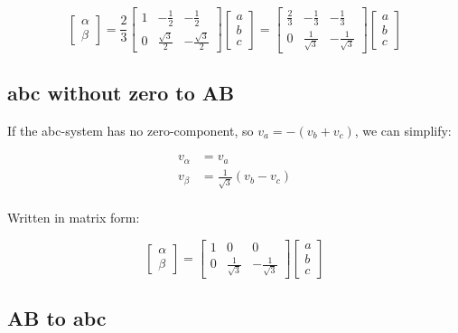 \documentclass[]{book}
\begin{document}
\[
\begin{bmatrix} \alpha\\ \beta \end{bmatrix}
= \frac{2}{3} \begin{bmatrix} 1 & -\frac{1}{2} & -\frac{1}{2} \\ 0 & \frac{\sqrt{3}}{2} & -\frac{\sqrt{3}}{2} \end{bmatrix}  
\begin{bmatrix} a\\ b \\ c \end{bmatrix}
= \begin{bmatrix} \frac{2}{3} & -\frac{1}{3} & -\frac{1}{3} \\ 0 & \frac{1}{\sqrt{3}} & -\frac{1}{\sqrt{3}} \end{bmatrix}
\begin{bmatrix} a\\ b \\ c \end{bmatrix}
\label{eq:abcAB2}
\]

\hypertarget{abc-without-zero-to-ab}{%
\subsection{abc without zero to AB}\label{abc-without-zero-to-ab}}

If the abc-system has no zero-component, so \(v_a=-(v_b+v_c)\), we can simplify:

\[
\begin{aligned}
v_\alpha &=   v_a\\
v_\beta &=  \frac{1}{\sqrt{3}} (v_b-v_c) \\
\end{aligned}
\label{eq:abcAB2}
\]

Written in matrix form:

\[
\begin{bmatrix} \alpha\\ \beta \end{bmatrix}
= \begin{bmatrix} 1 & 0 & 0 \\ 0 & \frac{1}{\sqrt{3}} & -\frac{1}{\sqrt{3}} \end{bmatrix}
\begin{bmatrix} a\\ b \\ c \end{bmatrix}
\label{eq:abcABmat2}
\]

\hypertarget{ab-to-abc}{%
\subsection{AB to abc}\label{ab-to-abc}}
\end{document}
